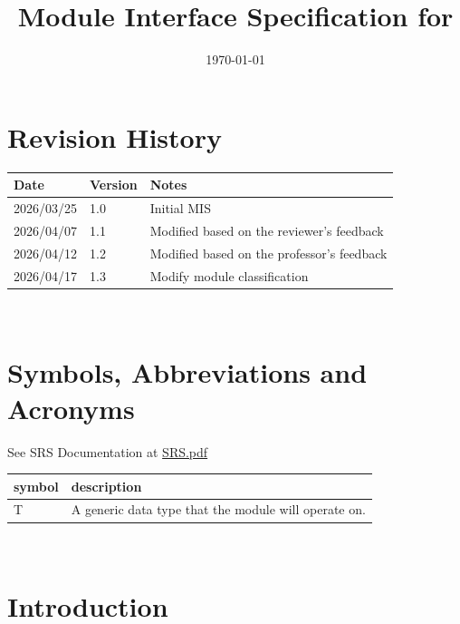 \documentclass[12pt, titlepage]{article}
\begin{document}
\title{Module Interface Specification for \progname{}}

\author{\authname}

\date{\today}

\maketitle


\section{Revision History}

\begin{tabularx}{\textwidth}{p{3cm}p{2cm}X}
\toprule {\bf Date} & {\bf Version} & {\bf Notes}\\
\midrule
2026/03/25 & 1.0 & Initial MIS\\
2026/04/07 & 1.1 & Modified based on the reviewer's feedback\\
2026/04/12 & 1.2 & Modified based on the professor's feedback\\
2026/04/17 & 1.3 & Modify module classification\\
\bottomrule
\end{tabularx}

~\newpage

\section{Symbols, Abbreviations and Acronyms}

See SRS Documentation at \href{https://mei0725.github.io/FlockingSimulator/SRS/SRS.pdf}{SRS.pdf}

\renewcommand{\arraystretch}{1.2}
\begin{tabular}{l l} 
  \toprule		
  \textbf{symbol} & \textbf{description}\\
  \midrule 
  T & A generic data type that the module will operate on.\\
  \bottomrule
\end{tabular}\\

\newpage

\tableofcontents

\newpage


\section{Introduction}
\end{document}
